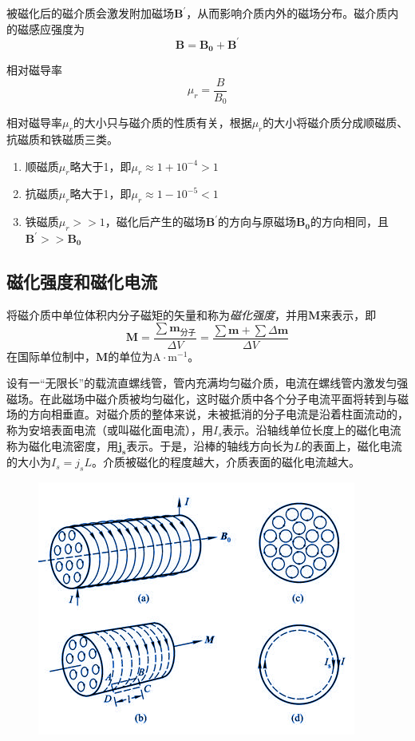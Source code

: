 \documentclass[
	12pt, %
	a4paper, %
]{myLegrandOrangeBook}
\begin{document}
被磁化后的磁介质会激发附加磁场\(\boldsymbol{B^\prime}\)，从而影响介质内外的磁场分布。磁介质内的磁感应强度为
\begin{equation}
    \boldsymbol{B} = \boldsymbol{B_0} + \boldsymbol{B^ \prime}
\end{equation}

相对磁导率
\begin{equation}
    \mu_r = \frac{B}{B_0}
\end{equation}

相对磁导率\(\mu_r\)的大小只与磁介质的性质有关，根据\(\mu_r\)的大小将磁介质分成顺磁质、抗磁质和铁磁质三类。

\begin{enumerate}
    \item 顺磁质\(\mu_r\)略大于1，即\(\mu_r \approx 1 + 10^{-4} > 1\)
    \item 抗磁质\(\mu_r\)略大于1，即\(\mu_r \approx 1 - 10^{-5} < 1\)
    \item 铁磁质\(\mu_r >> 1\)，磁化后产生的磁场\(\boldsymbol{B^\prime}\)的方向与原磁场\(\boldsymbol{B_0}\)的方向相同，且\(\boldsymbol{B^\prime} >> \boldsymbol{B_0}\)
\end{enumerate}

\subsection{磁化强度和磁化电流}

\begin{definition}[磁化强度]
    将磁介质中单位体积内分子磁矩的矢量和称为\emph{磁化强度}，并用\(\boldsymbol{M}\)来表示，即
    \begin{equation}
        \boldsymbol{M} = \frac{\sum \boldsymbol{m_{\text{分子}}}}{\Delta V} = \frac{\sum \boldsymbol{m} + \sum \Delta \boldsymbol{m}}{\Delta V}
    \end{equation}
    在国际单位制中，\(\boldsymbol{M}\)的单位为\(\mathrm{A} \cdot \mathrm{m}^{-1}\)。
\end{definition}

设有一“无限长”的载流直螺线管，管内充满均匀磁介质，电流在螺线管内激发匀强磁场。在此磁场中磁介质被均匀磁化，这时磁介质中各个分子电流平面将转到与磁场的方向相垂直。对磁介质的整体来说，未被抵消的分子电流是沿着柱面流动的，称为安培表面电流（或叫磁化面电流），用\(I_s\)表示。沿轴线单位长度上的磁化电流称为磁化电流密度，用\(\boldsymbol{j_s}\)表示。于是，沿棒的轴线方向长为\(L\)的表面上，磁化电流的大小为\(I_s = j_s L\)。介质被磁化的程度越大，介质表面的磁化电流越大。

\begin{figure}[!h]
    \centering
    \includegraphics[width = .4\textwidth]{graphics/磁化电流.png}
\end{figure}
\end{document}
